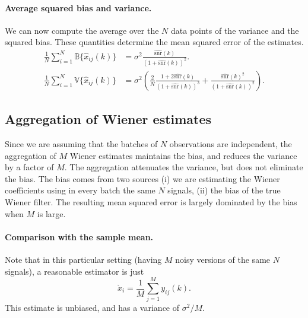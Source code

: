 \documentclass[a4paper,10pt]{article}
\begin{document}
\paragraph{Average squared bias and variance.} We can now compute the
average over the $N$ data points of the variance and the squared bias.
These quantities determine the mean squared error of the estimates.
\begin{align*}
	\frac1N\sum_{i = 1}^N\mathbb B\{\hat x_{ij}(k)\} &= \sigma^2\frac{\hat{\text{snr}}(k)}{(1 + \hat{\text{snr}}(k))^2}.\\
	\frac1N\sum_{i = 1}^N\mathbb V\{\hat x_{ij}(k)\} &=  
\sigma^2\left(\frac{2}N\frac{1 + 2\hat{\text{snr}}(k)}{(1 + \hat{\text{snr}}(k))^3} + 
\frac{\hat{\text{snr}}(k)^2}{(1 + \hat{\text{snr}}(k))^2}\right).
\end{align*}


\subsection{Aggregation of Wiener estimates}

Since we are assuming that the batches of $N$ observations are independent, 
the aggregation of $M$ Wiener estimates maintains the bias, and reduces
the variance by a factor of $M$.
%
%
The aggregation attenuates the variance, but does not eliminate the bias. The bias
comes from two sources (i) we are estimating the Wiener coefficients using in every
batch the same $N$ signals, (ii) the bias of the true Wiener filter. The
resulting mean squared error is largely dominated by the bias when $M$ is large.


\paragraph{Comparison with the sample mean.}Note that in this particular
setting (having $M$ noisy versions of the same $N$
signals), a reasonable estimator is just
\[\check x_i = \frac1M\sum_{j = 1}^M y_{ij}(k).\]
This estimate is unbiased, and has a variance of $\sigma^2/M$.
\end{document}

